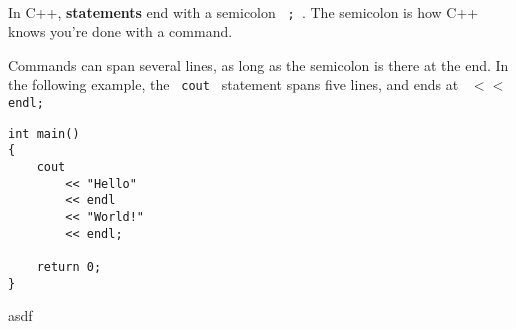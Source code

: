 \documentclass[a4paper,12pt]{book}
\begin{document}
                ~\\
                In C++, \textbf{ statements } end with a semicolon \texttt{ ; }.
                The semicolon is how C++ knows you're done with a command.

                \newpage
                Commands can span several lines, as long as the semicolon
                is there at the end. In the following example, the \texttt{ cout }
                statement spans five lines, and ends at \texttt{ $<<$ endl; } \\

\begin{lstlisting}[style=code]
int main()
{
    cout
        << "Hello"
        << endl
        << "World!"
        << endl;
        
    return 0;
}
\end{lstlisting}

                asdf
            
            
\end{document}
